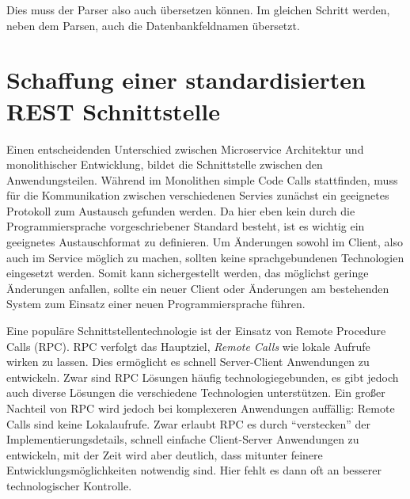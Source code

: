 \noindent Dies muss der Parser also auch übersetzen können. Im gleichen Schritt werden, neben dem Parsen, auch die Datenbankfeldnamen übersetzt.

\section{Schaffung einer standardisierten REST Schnittstelle}
Einen entscheidenden Unterschied zwischen Microservice Architektur und monolithischer Entwicklung, bildet die Schnittstelle zwischen den Anwendungsteilen. Während im Monolithen simple Code Calls stattfinden, muss für die Kommunikation zwischen verschiedenen Servies zunächst ein geeignetes Protokoll zum Austausch gefunden werden.
Da hier eben kein durch die Programmiersprache vorgeschriebener Standard besteht, ist es wichtig ein geeignetes Austauschformat zu definieren.
Um Änderungen sowohl im Client, also auch im Service möglich zu machen, sollten keine sprachgebundenen Technologien eingesetzt werden. Somit kann sichergestellt werden, das möglichst geringe Änderungen anfallen, sollte ein neuer Client oder Änderungen am bestehenden System zum Einsatz einer neuen Programmiersprache führen.

Eine populäre Schnittstellentechnologie ist der Einsatz von Remote Procedure Calls (RPC)\cite{rpc}. RPC verfolgt das Hauptziel, \textit{Remote Calls} wie lokale Aufrufe wirken zu lassen. Dies ermöglicht es schnell Server-Client Anwendungen zu entwickeln. Zwar sind RPC Lösungen häufig technologiegebunden\cite[vgl.][Seite 46]{newman2015building}, es gibt jedoch auch diverse Lösungen die verschiedene Technologien unterstützen. Ein großer Nachteil von RPC wird jedoch bei komplexeren Anwendungen auffällig: Remote Calls sind keine Lokalaufrufe.\cite[][Seite 47]{newman2015building} Zwar erlaubt RPC es durch ``verstecken'' der Implementierungsdetails, schnell einfache Client-Server Anwendungen zu entwickeln, mit der Zeit wird aber deutlich, dass mitunter feinere Entwicklungsmöglichkeiten notwendig sind. Hier fehlt es dann oft an besserer technologischer Kontrolle.

